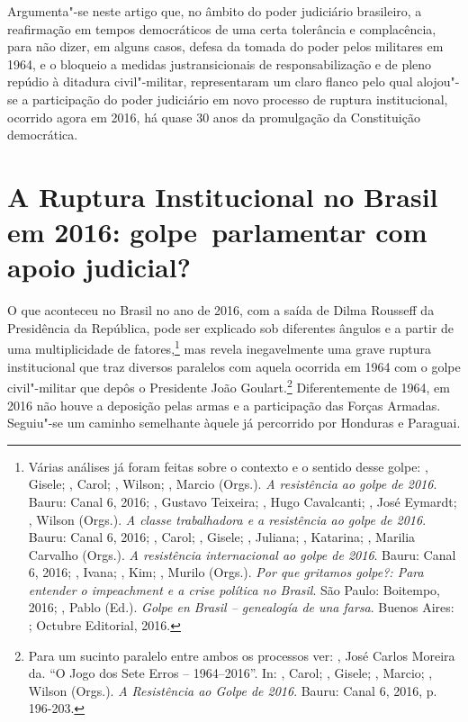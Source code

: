 Argumenta"-se neste artigo que, no âmbito do poder judiciário brasileiro,
a reafirmação em tempos democráticos de uma certa tolerância e
complacência, para não dizer, em alguns casos, defesa da tomada do poder
pelos militares em 1964, e o bloqueio a medidas justransicionais de
responsabilização e de pleno repúdio à ditadura civil"-militar,
representaram um claro flanco pelo qual alojou"-se a participação do
poder judiciário em novo processo de ruptura institucional, ocorrido
agora em 2016, há quase 30 anos da promulgação da Constituição
democrática.

\section{A Ruptura Institucional no Brasil em 2016: golpe~parlamentar
com apoio judicial?}

O que aconteceu no Brasil no ano de 2016, com a saída de Dilma Rousseff
da Presidência da República, pode ser explicado sob diferentes ângulos e
a partir de uma multiplicidade de fatores,\footnote{Várias análises já
  foram feitas sobre o contexto e o sentido desse golpe: ,
  Gisele; , Carol;  , Wilson; , Marcio (Orgs.).
  \emph{A resistência ao golpe de 2016}. Bauru: Canal 6, 2016; ,
  Gustavo Teixeira;  , Hugo Cavalcanti;
  , José Eymardt; 
  , Wilson (Orgs.). \emph{A classe trabalhadora e
  a resistência ao golpe de 2016}. Bauru: Canal 6, 2016; , Carol;
  , Gisele; ,
  Juliana; , Katarina;
  , Marilia Carvalho (Orgs.). \emph{A resistência
  internacional ao golpe de 2016}. Bauru: Canal 6, 2016; ,
  Ivana; , Kim; , Murilo (Orgs.). \emph{Por que gritamos
  golpe?: Para entender o impeachment e a crise política no Brasil}. São
  Paulo: Boitempo, 2016; , Pablo (Ed.). \emph{Golpe en Brasil
  -- genealogía de una farsa}. Buenos Aires: ; Octubre Editorial,
  2016.} mas revela inegavelmente uma grave ruptura institucional que
traz diversos paralelos com aquela ocorrida em 1964 com o golpe
civil"-militar que depôs o Presidente João Goulart.\footnote{Para um
  sucinto paralelo entre ambos os processos ver: , José
  Carlos Moreira da. ``O Jogo dos Sete Erros -- 1964--2016''. In: ,
  Carol; , Gisele; , Marcio;  , Wilson
  (Orgs.). \emph{A Resistência ao Golpe de 2016}. Bauru: Canal 6,
  2016, p. 196-203.} Diferentemente de 1964, em 2016 não houve a
deposição pelas armas e a participação das Forças Armadas. Seguiu"-se um
caminho semelhante àquele já percorrido por Honduras e Paraguai.

